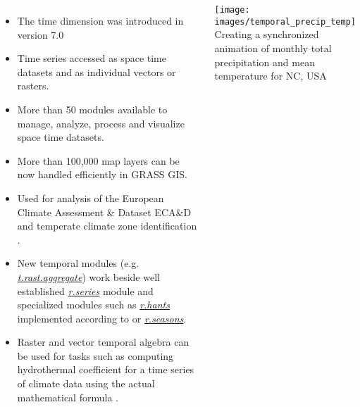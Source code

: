 \documentclass[25pt, margin=0mm, innermargin=25mm, blockverticalspace=25mm, colspace=25mm, subcolspace=8mm]{tikzposter}
\newcommand{\blocktitlewrap}[1]{\textnormal{\textsf{\textsc{\huge#1}}}}
\newcommand{\gmodule}[1]{\href{http://grass.osgeo.org/grass74/manuals/#1.html}{\emph{#1}}}
\newcommand{\gamodule}[1]{\href{http://grass.osgeo.org/grass74/manuals/addons/#1.html}{\emph{#1}}}
\begin{document}
\begin{columns}
{\begin{itemize}
 \item The time dimension was introduced in version 7.0 \citep{Gebbert20141, gebbert2015grass}
 \item Time series accessed as space time datasets and as individual vectors or rasters.
 \item More than 50 modules available to manage, analyze, process and visualize space time datasets.
 \item More than 100,000 map layers can be now handled efficiently in GRASS GIS.
 \item Used for analysis of the European Climate Assessment \& Dataset ECA\&D \citep{Haylock2008_climate_series}
       and temperate climate zone identification \citep{Gebbert20141}.
 \item New temporal modules (e.g. \gmodule{t.rast.aggregate}) work beside well established \gmodule{r.series} module
       and specialized modules such as \gamodule{r.hants} implemented according to \cite{roerink2000reconstructing} or \gamodule{r.seasons}.
 \item Raster and vector temporal algebra can be used for tasks
       such as computing hydrothermal coefficient for a time series of climate data using the actual mathematical formula
       \citep{leppelt2015grass}.
\end{itemize}

\vspace*{1.5cm}

\begin{minipage}{\linewidth}
\centering
\texttt{[image: images/temporal\_precip\_temp]}
\\
Creating a synchronized animation of monthly total precipitation and mean temperature for NC, USA
\end{minipage}

\vspace*{1cm}

}



\block{\blocktitlewrap{References}}{

\vspace{-0.2cm}

\scriptsize
\setstretch{0.5}

\newcommand{\blocksectiontitle}[1]{\textbf{#1}}

}
\end{columns}
\end{document}
